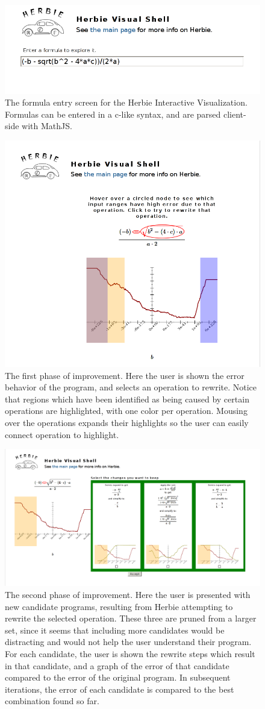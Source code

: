 \documentclass{chi2009}
\begin{document}
\begin{figure}
  \centering
  \includegraphics[width=.5\textwidth]{../../images/enter_formula_screen.png}
  \caption{The formula entry screen for the Herbie Interactive
    Visualization. Formulas can be entered in a c-like syntax, and are
    parsed client-side with MathJS.}
  \label{fig:enter-formula}
\end{figure}

\begin{figure}
  \centering
  \includegraphics[width=.5\textwidth]{../../images/select_location_screen.png}
  \caption{The first phase of improvement. Here the user is shown the
    error behavior of the program, and selects an operation to
    rewrite. Notice that regions which have been identified as being
    caused by certain operations are highlighted, with one color per
    operation. Mousing over the operations expands their highlights so
    the user can easily connect operation to highlight.}
  \label{fig:select-loc}
\end{figure}

\begin{figure}
  \centering
  \includegraphics[width=.5\textwidth]{../../images/select_children_screen.png}
  \caption{The second phase of improvement. Here the user is presented
    with new candidate programs, resulting from Herbie attempting to
    rewrite the selected operation. These three are pruned from a
    larger set, since it seems that including more candidates would be
    distracting and would not help the user understand their
    program. For each candidate, the user is shown the rewrite steps
    which result in that candidate, and a graph of the error of that
    candidate compared to the error of the original program. In
    subsequent iterations, the error of each candidate is compared to
    the best combination found so far.}
  \label{fig:select-children}
\end{figure}
\end{document}
